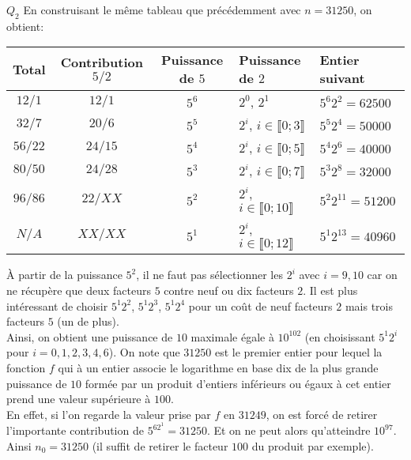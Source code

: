 \documentclass[11pt] {article}
\begin{document}
$Q_{2}$ En construisant le même tableau que précédemment avec $n = 31250$, on obtient:

\begin{center}
	\begin{tabular}{cccll}
		Total & Contribution $5/2$	& Puissance de $5$	& Puissance de $2$	& Entier suivant \\
		\hline
		$12/1$	&	$12/1$	& $5^{6}$	& $2^{0}$, $2^{1}$	& $5^{6}2^{2} = 62500$ \\
		$32/7$	&	$20/6$	& $5^{5}$	& $2^{i}$, $i \in \llbracket 0; 3 \rrbracket$	& $5^{5}2^{4} = 50000$ \\
		$56/22$	&	$24/15$	& $5^{4}$	& $2^{i}$, $i \in \llbracket 0; 5 \rrbracket$	& $5^{4}2^{6} = 40000$ \\
		$80/50$	&	$24/28$	& $5^{3}$	& $2^{i}$, $i \in \llbracket 0; 7 \rrbracket$	& $5^{3}2^{8} = 32000$ \\
		$96/86$	&	$22/XX$	& $5^{2}$	& $2^{i}$, $i \in \llbracket 0; 10 \rrbracket$	& $5^{2}2^{11} = 51200$ \\
		$N/A$	&	$XX/XX$	& $5^{1}$	& $2^{i}$, $i \in \llbracket 0; 12 \rrbracket$	& $5^{1}2^{13} = 40960$ \\
	\end{tabular}
\end{center}

À partir de la puissance $5^{2}$, il ne faut pas sélectionner les $2^{i}$ avec $i = 9, 10$ car on ne récupère que deux facteurs $5$ contre neuf ou dix facteurs $2$. 
Il est plus intéressant de choisir $5^{1}2^{2}$, $5^{1}2^{3}$, $5^{1}2^{4}$ pour un coût de neuf facteurs $2$ mais trois facteurs $5$ (un de plus).\\

Ainsi, on obtient une puissance de $10$ maximale égale à $10^{102}$ (en choisissant $5^{1}2^{i}$ pour $i = 0, 1, 2, 3, 4, 6$).
On note que $31250$ est le premier entier pour lequel la fonction $f$ qui à un entier associe le logarithme en base dix de la plus grande puissance de $10$ formée
par un produit d'entiers inférieurs ou égaux à cet entier prend une valeur supérieure à $100$.\\

En effet, si l'on regarde la valeur prise par $f$ en $31249$, on est forcé de retirer l'importante contribution de $5^62^{1} = 31250$. Et on ne peut alors qu'atteindre $10^{97}$. Ainsi $n_0 = 31250$ (il suffit de retirer le facteur $100$ du produit par exemple).
\end{document}
